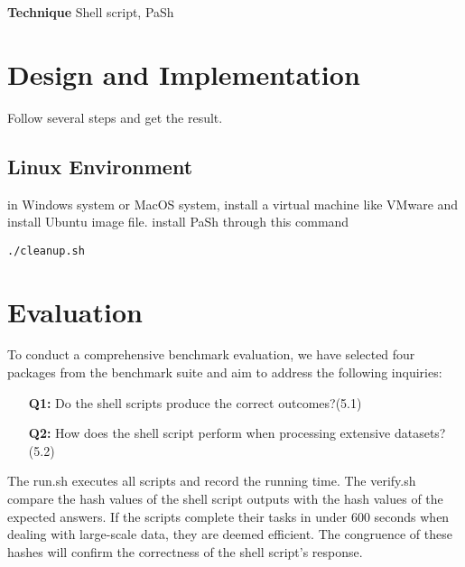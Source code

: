 \documentclass[sigplan, screen, 10pt]{acmart}
\begin{document}
\textbf{Technique} Shell script, PaSh

\section{Design and Implementation}
\label{tec}
Follow several steps and get the result.
\subsection{Linux Environment}
in Windows system or MacOS system, install a virtual machine like VMware and install Ubuntu image file.
install PaSh through this command
\begin{verbatim}
./cleanup.sh
\end{verbatim}

\section{Evaluation}
\label{eval}
To conduct a comprehensive benchmark evaluation, we have selected four packages from the benchmark suite and aim to address the following inquiries:
\begin{itemize}
\item[\textbf{Q1:}] Do the shell scripts produce the correct outcomes?(5.1)
\item[\textbf{Q2:}] How does the shell script perform when processing extensive datasets?(5.2)
\end{itemize}
The run.sh executes all scripts and record the running time.
The verify.sh compare the hash values of the shell script outputs with the hash values of the expected answers.
If the scripts complete their tasks in under 600 seconds when dealing with large-scale data, they are deemed efficient.
The congruence of these hashes will confirm the correctness of the shell script's response.
\end{document}
